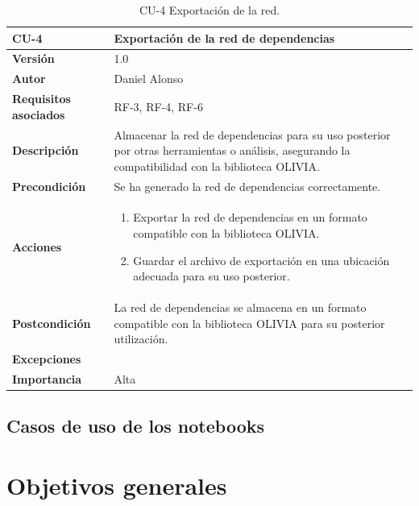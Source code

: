 \begin{table}[p]
	\centering
	\begin{tabularx}{\linewidth}{ p{} p{} }
		\toprule
		\textbf{CU-4}    & \textbf{Exportación de la red de dependencias}\\
		\toprule
		\textbf{Versión}              & 1.0    \\
		\textbf{Autor}                & Daniel Alonso \\
		\textbf{Requisitos asociados} & RF-3, RF-4, RF-6 \\
		\textbf{Descripción}          & Almacenar la red de dependencias para su uso posterior por otras herramientas o análisis, asegurando la compatibilidad con la biblioteca OLIVIA. \\
		\textbf{Precondición}         & Se ha generado la red de dependencias correctamente. \\
		\textbf{Acciones}             &
		\begin{enumerate}
			\def\labelenumi{\arabic{enumi}.}
			\tightlist
			\item Exportar la red de dependencias en un formato compatible con la biblioteca OLIVIA.
			\item Guardar el archivo de exportación en una ubicación adecuada para su uso posterior.
		\end{enumerate}\\
		\textbf{Postcondición}        & La red de dependencias se almacena en un formato compatible con la biblioteca OLIVIA para su posterior utilización. \\
		\textbf{Excepciones}          & \\
		\textbf{Importancia}          & Alta \\
		\bottomrule
	\end{tabularx}
	\caption{CU-4 Exportación de la red.}
	\label{tab:cu4}
\end{table}


\subsection{Casos de uso de los notebooks}

\section{Objetivos generales}







